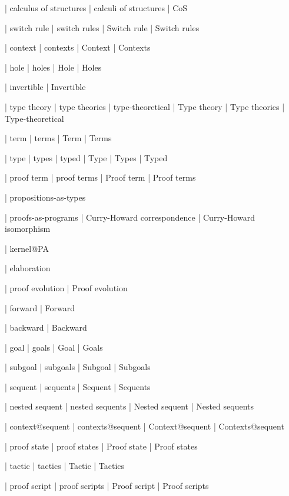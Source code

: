  | calculus of structures
 | calculi of structures
 | CoS
 
 | switch rule
 | switch rules
 | Switch rule
 | Switch rules
 
 | context
 | contexts
 | Context
 | Contexts

 | hole
 | holes
 | Hole
 | Holes

 | invertible
 | Invertible

 | type theory
 | type theories
 | type-theoretical
 | Type theory
 | Type theories
 | Type-theoretical

 | term
 | terms
 | Term
 | Terms

 | type
 | types
 | typed
 | Type
 | Types
 | Typed

 | proof term
 | proof terms
 | Proof term
 | Proof terms

 | propositions-as-types

 | proofs-as-programs
 | Curry-Howard correspondence
 | Curry-Howard isomorphism

 | kernel@PA

 | elaboration

 | proof evolution
 | Proof evolution

 | forward
 | Forward

 | backward
 | Backward
 
 | goal
 | goals
 | Goal
 | Goals

 | subgoal
 | subgoals
 | Subgoal
 | Subgoals

 | sequent
 | sequents
 | Sequent
 | Sequents

 | nested sequent
 | nested sequents
 | Nested sequent
 | Nested sequents

 | context@sequent
 | contexts@sequent
 | Context@sequent
 | Contexts@sequent

 | proof state
 | proof states
 | Proof state
 | Proof states

 | tactic
 | tactics
 | Tactic
 | Tactics

 | proof script
 | proof scripts
 | Proof script
 | Proof scripts

